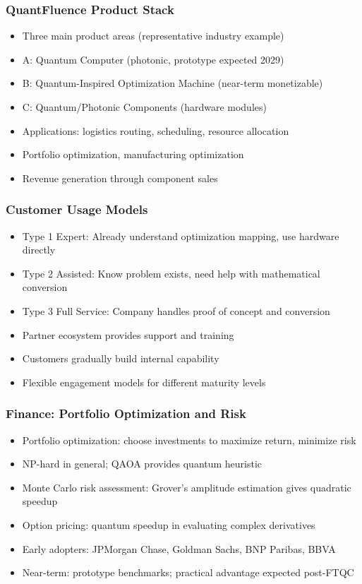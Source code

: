 \begin{frame}[fragile]\frametitle{QuantFluence Product Stack}
\begin{itemize}
\item Three main product areas (representative industry example)
\item A: Quantum Computer (photonic, prototype expected 2029)
\item B: Quantum-Inspired Optimization Machine (near-term monetizable)
\item C: Quantum/Photonic Components (hardware modules)
\item Applications: logistics routing, scheduling, resource allocation
\item Portfolio optimization, manufacturing optimization
\item Revenue generation through component sales
\end{itemize}
\end{frame}

\begin{frame}[fragile]\frametitle{Customer Usage Models}
\begin{itemize}
\item Type 1 Expert: Already understand optimization mapping, use hardware directly
\item Type 2 Assisted: Know problem exists, need help with mathematical conversion
\item Type 3 Full Service: Company handles proof of concept and conversion
\item Partner ecosystem provides support and training
\item Customers gradually build internal capability
\item Flexible engagement models for different maturity levels
\end{itemize}
\end{frame}

\begin{frame}[fragile]\frametitle{Finance: Portfolio Optimization and Risk}
\begin{itemize}
\item Portfolio optimization: choose investments to maximize return, minimize risk
\item NP-hard in general; QAOA provides quantum heuristic
\item Monte Carlo risk assessment: Grover's amplitude estimation gives quadratic speedup
\item Option pricing: quantum speedup in evaluating complex derivatives
\item Early adopters: JPMorgan Chase, Goldman Sachs, BNP Paribas, BBVA
\item Near-term: prototype benchmarks; practical advantage expected post-FTQC
\end{itemize}
\end{frame}

